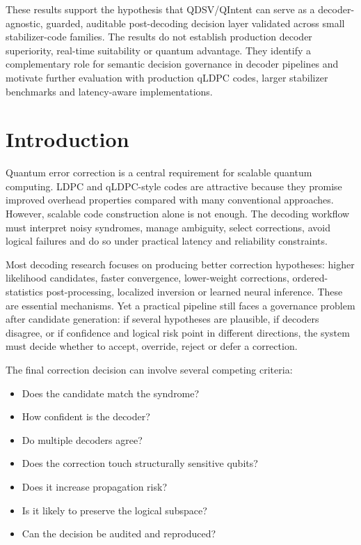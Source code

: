 \documentclass[11pt]{article}
\begin{document}
These results support the hypothesis that QDSV/QIntent can serve as a decoder-agnostic, guarded, auditable post-decoding decision layer validated across small stabilizer-code families. The results do not establish production decoder superiority, real-time suitability or quantum advantage. They identify a complementary role for semantic decision governance in decoder pipelines and motivate further evaluation with production qLDPC codes, larger stabilizer benchmarks and latency-aware implementations.


\section{Introduction}

Quantum error correction is a central requirement for scalable quantum computing. LDPC and qLDPC-style codes are attractive because they promise improved overhead properties compared with many conventional approaches. However, scalable code construction alone is not enough. The decoding workflow must interpret noisy syndromes, manage ambiguity, select corrections, avoid logical failures and do so under practical latency and reliability constraints.


Most decoding research focuses on producing better correction hypotheses: higher likelihood candidates, faster convergence, lower-weight corrections, ordered-statistics post-processing, localized inversion or learned neural inference. These are essential mechanisms. Yet a practical pipeline still faces a governance problem after candidate generation: if several hypotheses are plausible, if decoders disagree, or if confidence and logical risk point in different directions, the system must decide whether to accept, override, reject or defer a correction.


The final correction decision can involve several competing criteria:


\begin{itemize}[leftmargin=*]
\item Does the candidate match the syndrome?
\item How confident is the decoder?
\item Do multiple decoders agree?
\item Does the correction touch structurally sensitive qubits?
\item Does it increase propagation risk?
\item Is it likely to preserve the logical subspace?
\item Can the decision be audited and reproduced?
\end{itemize}
\end{document}
